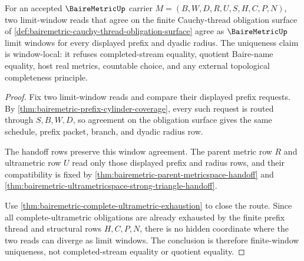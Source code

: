\begin{theorem}
\label{thm:bairemetric-prefix-limit-window-uniqueness}
For an accepted $\BaireMetricUp$ carrier $M=(B,W,D,R,U,S,H,C,P,N)$, two limit-window reads that agree on the finite Cauchy-thread obligation surface of \autoref{def:bairemetric-cauchy-thread-obligation-surface} agree as $\BaireMetricUp$ limit windows for every displayed prefix and dyadic radius. The uniqueness claim is window-local: it refuses completed-stream equality, quotient Baire-name equality, host real metrics, countable choice, and any external topological completeness principle.
\end{theorem}
\begin{proof}
Fix two limit-window reads and compare their displayed prefix requests. By \autoref{thm:bairemetric-prefix-cylinder-coverage}, every such request is routed through $S,B,W,D$, so agreement on the obligation surface gives the same schedule, prefix packet, branch, and dyadic radius row.

The handoff rows preserve this window agreement. The parent metric row $R$ and ultrametric row $U$ read only those displayed prefix and radius rows, and their compatibility is fixed by \autoref{thm:bairemetric-parent-metricspace-handoff} and \autoref{thm:bairemetric-ultrametricspace-strong-triangle-handoff}.

Use \autoref{thm:bairemetric-complete-ultrametric-exhaustion} to close the route. Since all complete-ultrametric obligations are already exhausted by the finite prefix thread and structural rows $H,C,P,N$, there is no hidden coordinate where the two reads can diverge as limit windows. The conclusion is therefore finite-window uniqueness, not completed-stream equality or quotient equality.
\end{proof}

